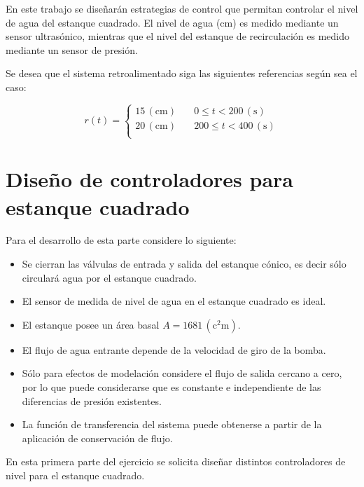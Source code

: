 \documentclass[11pt,letterpaper,notitlepage]{article}
\begin{document}
En este trabajo se diseñarán estrategias de control que permitan controlar el nivel de agua del estanque cuadrado. El nivel de agua (\si{\centi\meter}) es medido mediante un sensor ultrasónico, mientras que el nivel del estanque de recirculación es medido mediante un sensor de presión.

Se desea que el sistema retroalimentado siga las siguientes referencias según sea el caso:

\begin{equation}
\label{ref-r}
r(t) =
  \begin{cases}
    15 \,(\si{\centi\meter})       & \quad 0 \leq t < 200 \,(\si{\second})\\
    20 \,(\si{\centi\meter})       & \quad 200 \leq t < 400 \,(\si{\second})\\
  \end{cases}
\end{equation}

\section{Diseño de controladores para estanque cuadrado}

Para el desarrollo de esta parte considere lo siguiente:

\begin{itemize}

    \item Se cierran las válvulas de entrada y salida del estanque cónico, es decir sólo circulará agua por el estanque cuadrado.
    \item El sensor de medida de nivel de agua en el estanque cuadrado es ideal.
    \item El estanque posee un área basal $A=1681 \,(\si{\square\centi\meter})$.
    \item El flujo de agua entrante depende de la velocidad de giro de la bomba.
    \item Sólo para efectos de modelación considere el flujo de salida cercano a cero, por lo que puede considerarse que es constante e independiente de las diferencias de presión existentes.
    \item La función de transferencia del sistema puede obtenerse a partir de la aplicación de conservación de flujo.
    
\end{itemize}

En esta primera parte del ejercicio se solicita diseñar distintos controladores de nivel para el estanque cuadrado.
\end{document}
